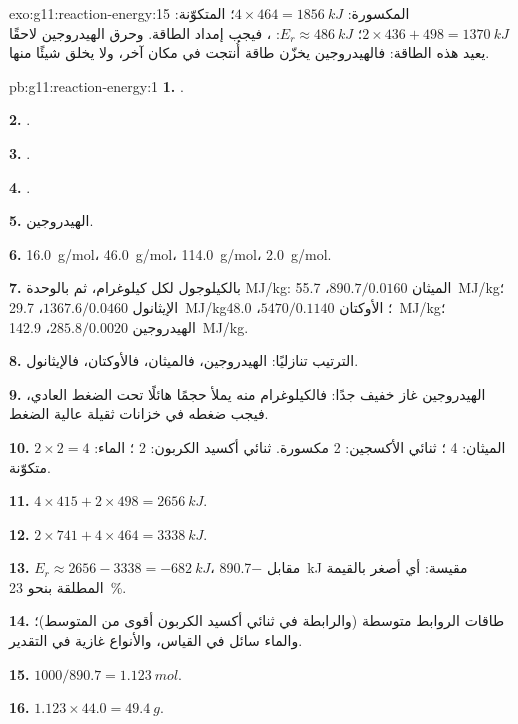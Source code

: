 \begin{solution}{exo:g11:reaction-energy:15}
المكسورة: $4 \times 464 = \qty{1856}{kJ}$؛ المتكوّنة: $2 \times 436 + 498 =
\qty{1370}{kJ}$؛ $E_r \approx \qty{+486}{kJ}$: ، فيجب
إمداد الطاقة. وحرق الهيدروجين لاحقًا يعيد هذه الطاقة:
فالهيدروجين يخزّن طاقة أُنتجت في مكان آخر، ولا يخلق شيئًا منها.
\end{solution}

\begin{solution}{pb:g11:reaction-energy:1}
\textbf{1.} .

\textbf{2.} .

\textbf{3.} .

\textbf{4.} .

\textbf{5.} الهيدروجين.

\textbf{6.} \qty{16.0}{g/mol}، \qty{46.0}{g/mol}، \qty{114.0}{g/mol}،
\qty{2.0}{g/mol}.

\textbf{7.} بالكيلوجول لكل كيلوغرام، ثم بالوحدة \si{MJ/kg}: الميثان
$890.7 / 0.0160$، \qty{55.7}{MJ/kg}؛ الإيثانول $1367.6 / 0.0460$،
\qty{29.7}{MJ/kg}؛ الأوكتان $5470 / 0.1140$، \qty{48.0}{MJ/kg}؛ الهيدروجين
$285.8 / 0.0020$، \qty{142.9}{MJ/kg}.

\textbf{8.} الترتيب تنازليًا: الهيدروجين، فالميثان، فالأوكتان، فالإيثانول.

\textbf{9.} الهيدروجين غاز خفيف جدًا: فالكيلوغرام منه يملأ حجمًا
هائلًا تحت الضغط العادي، فيجب ضغطه في خزانات ثقيلة
عالية الضغط.

\textbf{10.} الميثان: 4 ؛ ثنائي الأكسجين: 2  مكسورة. ثنائي
أكسيد الكربون: 2 ؛ الماء: $2 \times 2 = 4$  متكوّنة.

\textbf{11.} $4 \times 415 + 2 \times 498 = \qty{2656}{kJ}$.

\textbf{12.} $2 \times 741 + 4 \times 464 = \qty{3338}{kJ}$.

\textbf{13.} $E_r \approx 2656 - 3338 = \qty{-682}{kJ}$، مقابل
\qty{-890.7}{kJ} مقيسة: أي أصغر بالقيمة المطلقة بنحو \qty{23}{\percent}.

\textbf{14.} طاقات الروابط متوسطة (والرابطة  في ثنائي أكسيد الكربون
أقوى من المتوسط)؛ والماء سائل في القياس، والأنواع غازية في
التقدير.

\textbf{15.} $1000 / 890.7 = \qty{1.123}{mol}$.

\textbf{16.} $1.123 \times 44.0 = \qty{49.4}{g}$.


\end{solution}
